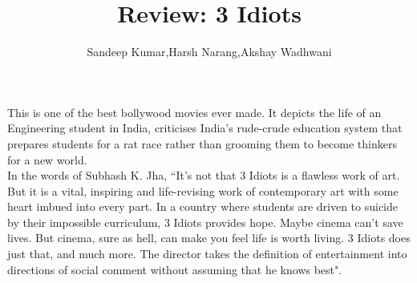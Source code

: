 \documentclass{article}
\title{Review: 3 Idiots}
\author{Sandeep Kumar,Harsh Narang,Akshay Wadhwani}
\begin{document}
\maketitle
This is one of the best bollywood movies ever made. It depicts the life of an Engineering student in India, criticises India's rude-crude education system that prepares students for a rat race rather than grooming them to become thinkers for a new world.\\
In the words of Subhash K. Jha, ``It's not that 3 Idiots is a flawless work of art. But it is a vital, inspiring and life-revising work of contemporary art with some heart imbued into every part. In a country where students are driven to suicide by their impossible curriculum, 3 Idiots provides hope. Maybe cinema can't save lives. But cinema, sure as hell, can make you feel life is worth living. 3 Idiots does just that, and much more. The director takes the definition of entertainment into directions of social comment without assuming that he knows best".\\
\end{document}
